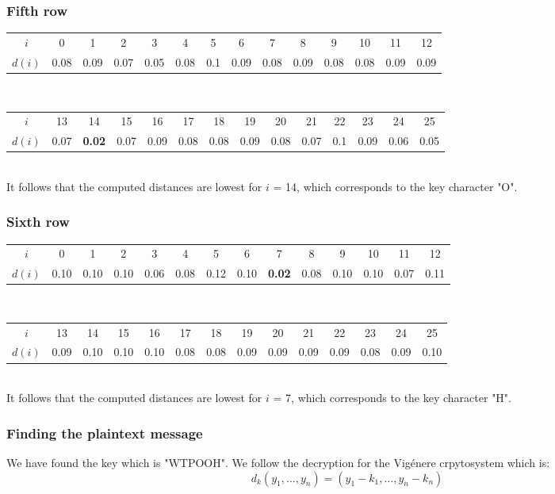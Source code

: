 \documentclass[11pt]{report}
\begin{document}
\subsubsection{Fifth row}
\begin{tabular}{| c | c c c c c c c c c c c c c |}
\hline
$i$ & 0 & 1 & 2 & 3 & 4 & 5 & 6 & 7 & 8 & 9 & 10 & 11 & 12\\
$d(i)$ & 0.08
& 0.09
& 0.07
& 0.05
& 0.08
& 0.1
& 0.09
& 0.08
& 0.09
& 0.08
& 0.08
& 0.09
& 0.09\\
\hline
\end{tabular}
\\[0.05cm]
\begin{tabular}{| c | c c c c c c c c c c c c c |}
\hline
$i$ & 13 & 14 & 15 & 16 & 17 & 18 & 19 & 20 & 21 & 22 & 23 & 24 & 25\\
$d(i)$ & 0.07
& \textbf{0.02}
& 0.07
& 0.09
& 0.08
& 0.08
& 0.09
& 0.08
& 0.07
& 0.1
& 0.09
& 0.06
& 0.05\\
\hline
\end{tabular}
${}$\\
It follows that the computed distances are lowest for $i$ = 14, which corresponds to the key
character "O".

\subsubsection{Sixth row}
\begin{tabular}{| c | c c c c c c c c c c c c c |}
\hline
$i$ & 0 & 1 & 2 & 3 & 4 & 5 & 6 & 7 & 8 & 9 & 10 & 11 & 12\\
$d(i)$ & 0.10
& 0.10
& 0.10
& 0.06
& 0.08
& 0.12
& 0.10
& \textbf{0.02}
& 0.08
& 0.10
& 0.10
& 0.07
& 0.11\\
\hline
\end{tabular}
\\[0.05cm]
\begin{tabular}{| c | c c c c c c c c c c c c c |}
\hline
$i$ & 13 & 14 & 15 & 16 & 17 & 18 & 19 & 20 & 21 & 22 & 23 & 24 & 25\\
$d(i)$ & 0.09
& 0.10
& 0.10
& 0.10
& 0.08
& 0.08
& 0.09
& 0.09
& 0.09
& 0.09
& 0.08
& 0.09
& 0.10\\
\hline
\end{tabular}
${}$\\
It follows that the computed distances are lowest for $i$ = 7, which corresponds to the key
character "H".

\subsubsection*{Finding the plaintext message}
We have found the key which is "WTPOOH". We follow the decryption for the Vig\'{e}nere crpytosystem which is:
$$d_k(y_1,\dots,y_n) = (y_1 - k_1,\dots,y_n - k_n)$$
\end{document}
